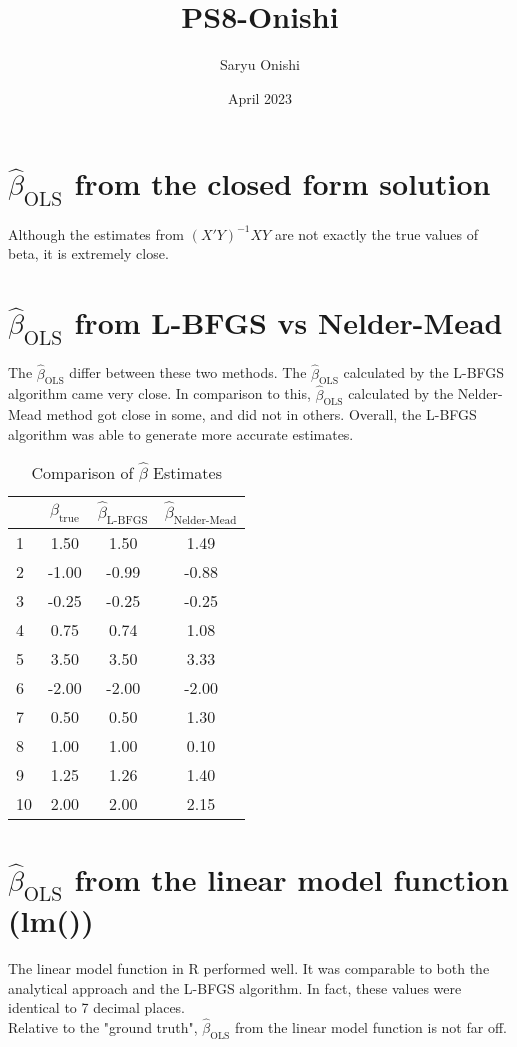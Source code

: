 \documentclass{article}
\begin{document}
\title{PS8-Onishi}
\author{Saryu Onishi}
\date{April 2023}
\maketitle

\section{$\hat{\beta}_{\text{OLS}}$ from the closed form solution}
Although the estimates from $(X'Y)^{-1}XY$ are not exactly the true values of beta, it is extremely close.

\section{$\hat{\beta}_{\text{OLS}}$ from L-BFGS vs Nelder-Mead}
The $\hat{\beta}_{\text{OLS}}$ differ between these two methods. The $\hat{\beta}_{\text{OLS}}$ calculated by the L-BFGS algorithm came very close. In comparison to this, $\hat{\beta}_{\text{OLS}}$ calculated by the Nelder-Mead method got close in some, and did not in others. Overall, the L-BFGS algorithm was able to generate more accurate estimates.

\begin{table}[h]
\centering
\caption{Comparison of $\hat{\beta}$ Estimates}
\label{tab:beta_estimates}
\begin{tabular}{@{}lccc@{}}
\toprule
& $\beta_{\text{true}}$ & $\hat{\beta}_{\text{L-BFGS}}$ & $\hat{\beta}_{\text{Nelder-Mead}}$ \\
\midrule
1 & 1.50 & 1.50 & 1.49\\
2 & -1.00 & -0.99 & -0.88\\
3 & -0.25 & -0.25 & -0.25\\
4 & 0.75 & 0.74 & 1.08\\
5 & 3.50 & 3.50 & 3.33\\
6 & -2.00 & -2.00 & -2.00\\
7 & 0.50 & 0.50 & 1.30\\
8 & 1.00 & 1.00 & 0.10\\
9 & 1.25 & 1.26 & 1.40\\
10 & 2.00 & 2.00 & 2.15\\
\bottomrule
\end{tabular}
\end{table}

\section{$\hat{\beta}_{\text{OLS}}$ from the linear model function (lm())}
The linear model function in R performed well. It was comparable to both the analytical approach and the L-BFGS algorithm. In fact, these values were identical to 7 decimal places.\\
Relative to the "ground truth", $\hat{\beta}_{\text{OLS}}$ from the linear model function is not far off.
\end{document}
